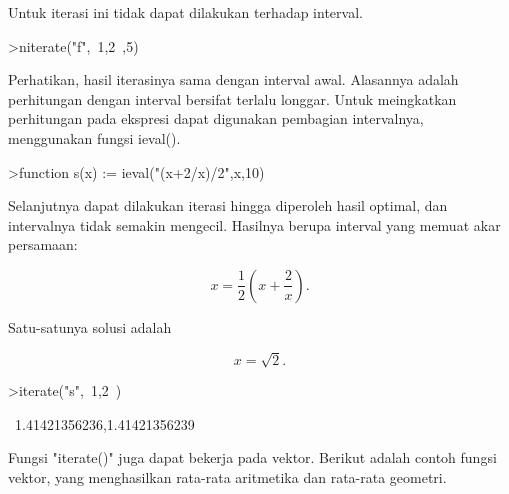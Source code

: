\documentclass[a4paper,10pt]{article}
\begin{document}
\begin{eulernotebook}
\begin{eulercomment}
\begin{eulercomment}
\begin{eulercomment}
\begin{eulercomment}
\begin{eulercomment}
\begin{eulercomment}
\begin{euleroutput}
\end{euleroutput}
\begin{eulercomment}
Untuk iterasi ini tidak dapat dilakukan terhadap interval.
\end{eulercomment}
\begin{eulerprompt}
>niterate("f",~1,2~,5)
\end{eulerprompt}
\begin{euleroutput}
  [ ~1,2~,  ~1,2~,  ~1,2~,  ~1,2~,  ~1,2~,  ~1,2~ ]
\end{euleroutput}
\begin{eulercomment}
Perhatikan, hasil iterasinya sama dengan interval awal. Alasannya adalah perhitungan dengan
interval bersifat terlalu longgar. Untuk meingkatkan perhitungan pada ekspresi dapat
digunakan pembagian intervalnya, menggunakan fungsi ieval().
\end{eulercomment}
\begin{eulerprompt}
>function s(x) := ieval("(x+2/x)/2",x,10)
\end{eulerprompt}
\begin{eulercomment}
Selanjutnya dapat dilakukan iterasi hingga diperoleh hasil optimal,
dan intervalnya tidak semakin mengecil. Hasilnya berupa interval yang
memuat akar persamaan:

\end{eulercomment}
\begin{eulerformula}
\[
x = \frac{1}{2} \left( x + \frac{2}{x} \right).
\]
\end{eulerformula}
\begin{eulercomment}
Satu-satunya solusi adalah\\
\end{eulercomment}
\begin{eulerformula}
\[
x = \sqrt2.
\]
\end{eulerformula}
\begin{eulerprompt}
>iterate("s",~1,2~)
\end{eulerprompt}
\begin{euleroutput}
  ~1.41421356236,1.41421356239~
\end{euleroutput}
\begin{eulercomment}
Fungsi "iterate()" juga dapat bekerja pada vektor. Berikut adalah
contoh fungsi vektor, yang menghasilkan rata-rata aritmetika dan
rata-rata geometri.


\end{eulercomment}
\end{eulercomment}
\end{eulercomment}
\end{eulercomment}
\end{eulercomment}
\end{eulercomment}
\end{eulercomment}
\end{eulernotebook}
\end{document}
